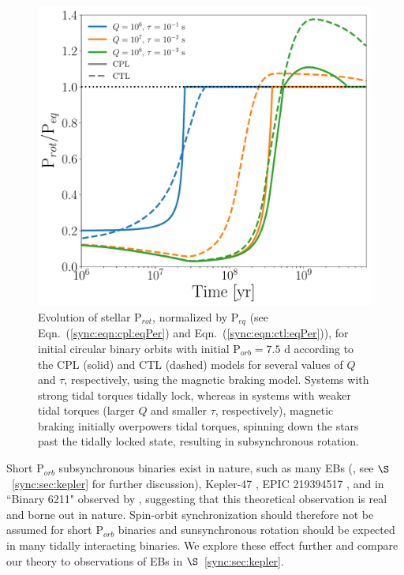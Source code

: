 \begin{figure}
	\includegraphics[width=\columnwidth]{eqPerShortPorbMatt.pdf}
   \caption{Evolution of stellar P$_{rot}$, normalized by P$_{eq}$ (see Eqn.~(\ref{sync:eqn:cpl:eqPer}) and Eqn.~(\ref{sync:eqn:ctl:eqPer})), for initial circular binary orbits with initial P$_{orb} = 7.5$ d according to the CPL (solid) and CTL (dashed) models for several values of $Q$ and $\tau$, respectively, using the \citet{Matt2015} magnetic braking model. Systems with strong tidal torques tidally lock, whereas in systems with weaker tidal torques (larger $Q$ and smaller $\tau$, respectively), magnetic braking initially overpowers tidal torques, spinning down the stars past the tidally locked state, resulting in subsynchronous rotation. }%
    \label{sync:fig:eqPerShortPorb}%
\end{figure}


Short P$_{orb}$ subsynchronous binaries exist in nature, such as many \kepler EBs (\citet{Lurie2017}, see $\S$~\ref{sync:sec:kepler} for further discussion), Kepler-47 \citep{Orosz2012}, EPIC 219394517 \citep{Torres2018}, and in ``Binary 6211" observed by \citet{Meibom2006}, suggesting that this theoretical observation is real and borne out in nature. Spin-orbit synchronization should therefore not be assumed for short P$_{orb}$ binaries and sunsynchronous rotation should be expected in many tidally interacting binaries.  We explore these effect further and compare our theory to observations of \kepler EBs in $\S$~\ref{sync:sec:kepler}.

